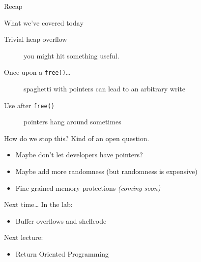 \documentclass[9pt,aspectratio=169]{beamer}
\begin{document}
\begin{frame}[label={sec:orgee2ddaa},fragile]{Recap}
 \begin{block}{What we've covered today}
\begin{description}
\item[{Trivial heap overflow}] you might hit something useful.
\item[{Once upon a \texttt{free()}\ldots{}}] spaghetti with pointers can lead to an arbitrary write
\item[{Use after \texttt{free()}}] pointers hang around sometimes
\end{description}
\end{block}
\begin{block}{How do we stop this?}
Kind of an open question.
\begin{itemize}
\item Maybe don't let developers have pointers?
\item Maybe add more randomness (but randomness is expensive)
\item Fine-grained memory protections \emph{(coming soon)}
\end{itemize}
\end{block}
\begin{block}{Next time\ldots{}}
In the lab:
\begin{itemize}
\item Buffer overflows and shellcode
\end{itemize}

Next lecture:
\begin{itemize}
\item Return Oriented Programming
\end{itemize}
\end{block}
\end{frame}
\end{document}
